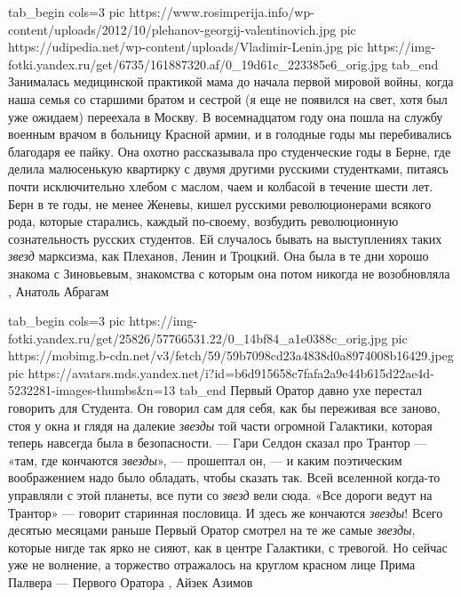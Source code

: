 \ifcmt
  tab_begin cols=3
     pic https://www.rosimperija.info/wp-content/uploads/2012/10/plehanov-georgij-valentinovich.jpg
		 pic https://udipedia.net/wp-content/uploads/Vladimir-Lenin.jpg
		 pic https://img-fotki.yandex.ru/get/6735/161887320.af/0_19d61c_223385e6_orig.jpg
  tab_end
\fi
Занималась медицинской практикой мама до начала первой мировой войны, когда
наша семья со старшими братом и сестрой (я еще не появился на свет, хотя был
уже ожидаем) переехала в Москву. В восемнадцатом году она пошла на службу
военным врачом в больницу Красной армии, и в голодные годы мы перебивались
благодаря ее пайку. Она охотно рассказывала про студенческие годы в Берне, где
делила малюсенькую квартирку с двумя другими русскими студентками, питаясь
почти исключительно хлебом с маслом, чаем и колбасой в течение шести лет. Берн
в те годы, не менее Женевы, кишел русскими революционерами всякого рода,
которые старались, каждый по-своему, возбудить революционную сознательность
русских студентов. Ей случалось бывать на выступлениях таких \emph{звезд} марксизма,
как Плеханов, Ленин и Троцкий. Она была в те дни хорошо знакома с Зиновьевым,
знакомства с которым она потом никогда не возобновляла
, Анатоль Абрагам

\ifcmt
  tab_begin cols=3
		 pic https://img-fotki.yandex.ru/get/25826/57766531.22/0_14bf84_a1e0388c_orig.jpg
     pic https://mobimg.b-cdn.net/v3/fetch/59/59b7098cd23a4838d0a8974008b16429.jpeg
		 pic https://avatars.mds.yandex.net/i?id=b6d915658c7fafa2a9e44b615d22ae4d-5232281-images-thumbs&n=13
  tab_end
\fi
Первый Оратор давно ухе перестал говорить для Студента. Он говорил сам для
себя, как бы переживая все заново, стоя у окна и глядя на далекие \emph{звезды}
той части огромной Галактики, которая теперь навсегда была в безопасности.  —
Гари Селдон сказал про Трантор — «там, где кончаются \emph{звезды}», —
прошептал он, — и каким поэтическим воображением надо было обладать, чтобы
сказать так. Всей вселенной когда-то управляли с этой планеты, все пути со
\emph{звезд} вели сюда. «Все дороги ведут на Трантор» — говорит старинная
пословица. И здесь же кончаются \emph{звезды}!  Всего десятью месяцами раньше
Первый Оратор смотрел на те же самые \emph{звезды}, которые нигде так ярко не
сияют, как в центре Галактики, с тревогой.  Но сейчас уже не волнение, а
торжество отражалось на круглом красном лице Прима Палвера — Первого Оратора
, Айзек Азимов
